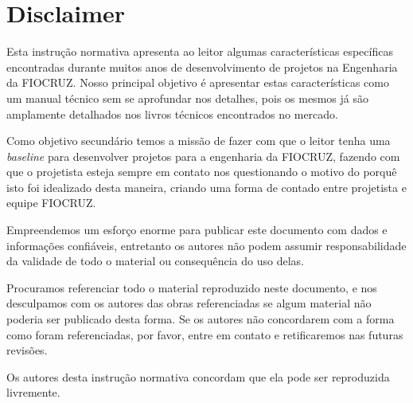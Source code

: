 \section*{Disclaimer} \label{section: disclaimer}

Esta instrução normativa apresenta ao leitor algumas características específicas encontradas durante muitos anos de desenvolvimento de projetos na Engenharia da FIOCRUZ. Nosso principal objetivo é apresentar estas características como um manual técnico sem se aprofundar nos detalhes, pois os mesmos já são amplamente detalhados nos livros técnicos encontrados no mercado.

Como objetivo secundário temos a missão de fazer com que o leitor tenha uma \textit{baseline} para desenvolver projetos para a engenharia da FIOCRUZ, fazendo com que o projetista esteja sempre em contato nos questionando o motivo do porquê isto foi idealizado desta maneira, criando uma forma de contado entre projetista e equipe FIOCRUZ.

Empreendemos um esforço enorme para publicar este documento com dados e informações confiáveis, entretanto os autores não podem assumir responsabilidade da validade de todo o material ou consequência do uso delas.

Procuramos referenciar todo o material reproduzido neste documento, e nos desculpamos com os autores das obras referenciadas se algum material não poderia ser publicado desta forma. Se os autores não concordarem com a forma como foram referenciadas, por favor, entre em contato e retificaremos nas futuras revisões.

Os autores desta instrução normativa concordam que ela pode ser reproduzida livremente.